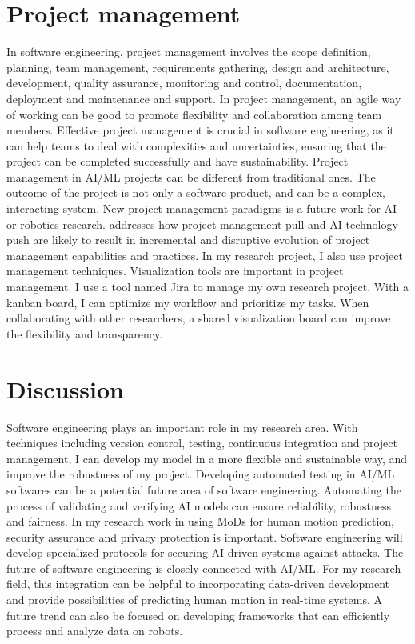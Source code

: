 \documentclass[11pt]{article}
\begin{document}
\section{Project management}
In software engineering, project management involves the scope definition, planning, team management, requirements gathering, design and architecture, development, quality assurance, monitoring and control, documentation, deployment and maintenance and support. In project management, an agile way of working can be good to promote flexibility and collaboration among team members. Effective project management is crucial in software engineering, as it can help teams to deal with complexities and uncertainties, ensuring that the project can be completed successfully and have sustainability. Project management in AI/ML projects can be different from traditional ones. The outcome of the project is not only a software product, and can be a complex, interacting system. New project management paradigms is a future work for AI or robotics research. \cite{projectmanagement} addresses how project management pull and AI technology push are likely to result in incremental and disruptive evolution of project management capabilities and practices. In my research project, I also use project management techniques. Visualization tools are important in project management.  I use a tool named Jira to manage my own research project. With a kanban board, I can optimize my workflow and prioritize my tasks. When collaborating with other researchers, a shared visualization board can improve the flexibility and transparency. 

\section{Discussion}

Software engineering plays an important role in my research area. With techniques including version control, testing, continuous integration and project management, I can develop my model in a more flexible and sustainable way, and improve the robustness of my project. Developing automated testing in AI/ML softwares can be a potential future area of software engineering. Automating the process of validating and verifying AI models can ensure reliability, robustness and fairness. In my research work in using MoDs for human motion prediction, security assurance and privacy protection is important. Software engineering will develop specialized protocols for securing AI-driven systems against attacks. The future of software engineering is closely connected with AI/ML. For my research field, this integration can be helpful to incorporating data-driven development and provide possibilities of predicting human motion in real-time systems. A future trend can also be focused on developing frameworks that can efficiently process and analyze data on robots.



\end{document}
